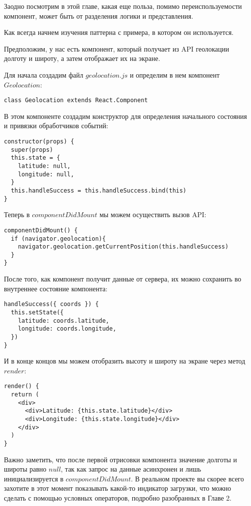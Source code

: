 Заодно посмотрим в этой главе, какая еще польза, помимо переиспользуемости компонент, может быть от разделения логики и представления.

Как всегда начнем изучения паттерна с примера, в котором он используется.

Предположим, у нас есть компонент, который получает из API геолокации долготу и широту, а затем отображает их на экране.

Для начала создадим файл $geolocation.js$ и определим в нем компонент $Geolocation$:

\begin{lstlisting}
class Geolocation extends React.Component
\end{lstlisting}

В этом компоненте создадим конструктор для определения начального состояния и привязки обработчиков событий:

\begin{lstlisting}
constructor(props) {
  super(props)
  this.state = {
    latitude: null,
    longitude: null,
  }
  this.handleSuccess = this.handleSuccess.bind(this)
}
\end{lstlisting}

Теперь в $componentDidMount$ мы можем осуществить вызов API:

\begin{lstlisting}
componentDidMount() {
  if (navigator.geolocation){     
    navigator.geolocation.getCurrentPosition(this.handleSuccess)
  }
}
\end{lstlisting}

После того, как компонент получит данные от сервера, их можно сохранить во внутреннее состояние компонента:

\begin{lstlisting}
handleSuccess({ coords }) {
  this.setState({
    latitude: coords.latitude,
    longitude: coords.longitude,
  })
}
\end{lstlisting}

И в конце концов мы можем отобразить высоту и широту на экране через метод $render$:

\begin{lstlisting}
render() {
  return (
    <div>
      <div>Latitude: {this.state.latitude}</div>
      <div>Longitude: {this.state.longitude}</div>
    </div> 
  )
}
\end{lstlisting}

Важно заметить, что после первой отрисовки компонента значение долготы и широты равно $null$, так как запрос на данные асинхронен и лишь инициализируется в $componentDidMount$. В реальном проекте вы скорее всего захотите в этот момент показывать какой-то индикатор загрузки, что можно сделать с помощью условных операторов, подробно разобранных в Главе 2.

